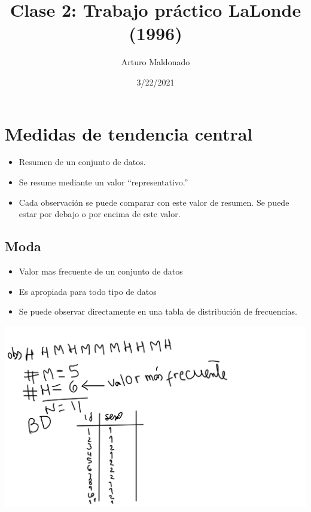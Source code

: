 \documentclass[
]{article}
\title{Clase 2: Trabajo práctico LaLonde (1996)}
\author{Arturo Maldonado}
\date{3/22/2021}
\begin{document}
\maketitle

\hypertarget{medidas-de-tendencia-central}{%
\section{Medidas de tendencia
central}\label{medidas-de-tendencia-central}}

\begin{itemize}
\item
  Resumen de un conjunto de datos.
\item
  Se resume mediante un valor ``representativo.''
\item
  Cada observación se puede comparar con este valor de resumen. Se puede
  estar por debajo o por encima de este valor.
\end{itemize}

\hypertarget{moda}{%
\subsection{Moda}\label{moda}}

\begin{itemize}
\item
  Valor mas frecuente de un conjunto de datos
\item
  Es apropiada para todo tipo de datos
\item
  Se puede observar directamente en una tabla de distribución de
  frecuencias.
\end{itemize}

\includegraphics[width=6.13542in,height=\textheight]{Captura de Pantalla 2021-04-02 a la(s) 12.12.02.png}
\end{document}
